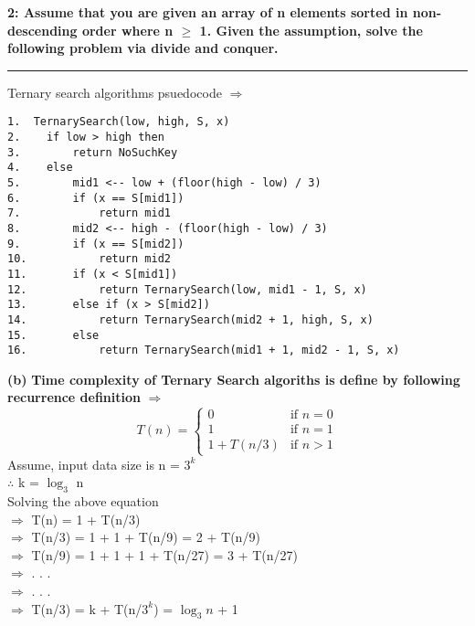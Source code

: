 \documentclass[11pt]{article}
\newcommand\question[3]{\vspace{.25in}\textbf{#1: #2}\vspace{.5em}\hrule\vspace{.10in}}
\renewcommand\part[1]{\vspace{.10in}\textbf{(#1)}}
\begin{document}
  


\question{2}{Assume that you are given an array of n elements sorted in non-descending order where n $\geq$ 1. Given the assumption, solve the following problem via divide and conquer.}

\part{a} Ternary search algorithms psuedocode $\Rightarrow$
\begin{verbatim}
1.  TernarySearch(low, high, S, x)
2.    if low > high then
3.        return NoSuchKey
4.    else 
5.        mid1 <-- low + (floor(high - low) / 3)
6.        if (x == S[mid1])
7.            return mid1
8.        mid2 <-- high - (floor(high - low) / 3)
9.        if (x == S[mid2])
10.           return mid2
11.       if (x < S[mid1])
12.           return TernarySearch(low, mid1 - 1, S, x)
13.       else if (x > S[mid2])
14.           return TernarySearch(mid2 + 1, high, S, x)
15.       else 
16.           return TernarySearch(mid1 + 1, mid2 - 1, S, x)
\end{verbatim}

\part{b} \textbf{Time complexity of Ternary Search algoriths is define by following recurrence definition} $\Rightarrow$
\[ T(n) = \begin{cases}
				0 & \text{if $n = 0$} \\
				1 & \text{if  $n = 1$} \\
				1 + T(n/3) & \text{if $n > 1$}
			\end{cases}
\]
Assume, input data size is n = $3^k$ \\
$\therefore$ k = $\log_3$ n\\
Solving the above equation \\
\hspace{5cm} $\Rightarrow$ T(n) = 1 + T(n/3) \\
\hspace{5cm} $\Rightarrow$ T(n/3) = 1 + 1 + T(n/9) = 2 + T(n/9)\\
\hspace{5cm} $\Rightarrow$ T(n/9) = 1 + 1 + 1 + T(n/27) = 3 + T(n/27)\\
\hspace{5cm} $\Rightarrow$ . . . \\
\hspace{5cm} $\Rightarrow$ . . . \\
\hspace{5cm} $\Rightarrow$ T(n/3) = k + T(n/$3^k$) = $\log_3 n$ + 1\\
 
\end{document}
